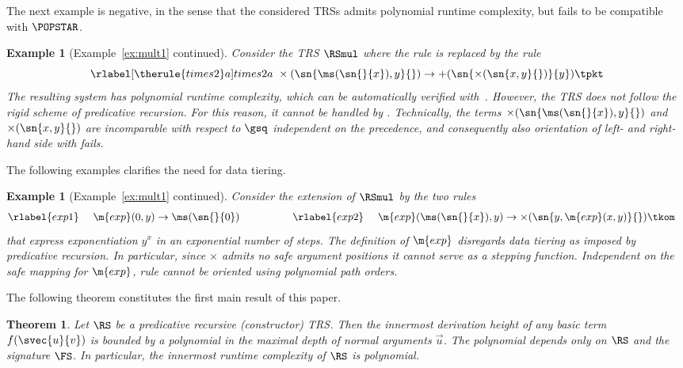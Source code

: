 \documentclass{LMCS}
\newtheorem{example}[thm]{Example}
\newtheorem{theorem}[thm]{Theorem}
\begin{document}
The next example is negative, in the sense that the considered TRSs admits
polynomial runtime complexity, but fails to be compatible with $\POPSTAR$.
\begin{example}[Example~\ref{ex:mult1} continued]
Consider the TRS $\RSmul$ where the rule  is replaced by the rule
  $$
  \rlabel[\therule{times2}a]{times2a}~\times(\sn{\ms(\sn{}{x}),y}{}) \to +(\sn{\times(\sn{x,y}{})}{y})
  \tpkt
  $$
  The resulting system has polynomial runtime complexity, which can
  be automatically verified with~\TCT. However, the TRS does not follow the rigid 
  scheme of predicative recursion. For this reason, it cannot be handled by \POPSTAR.\@
  Technically, the terms $\times(\sn{\ms(\sn{}{x}),y}{})$ and $\times(\sn{x,y}{})$ 
  are incomparable with respect to $\gsq$ independent on the precedence, and 
  consequently also orientation of left- and right-hand side with 
   fails. 
\end{example}

The following examples clarifies the need for data tiering.
\begin{example}[Example~\ref{ex:mult1} continued]
  Consider the extension of $\RSmul$ by the two rules
  \begin{alignat*}{4}
    \rlabel{exp1} &~& \m{exp}(0,y) & \to \ms(\sn{}{0})  \qquad\qquad &
    \rlabel{exp2} &~& \m{exp}(\ms(\sn{}{x}),y) & \to \times(\sn{y,\m{exp}(x,y)}{}) \tkom
  \end{alignat*}
  that express exponentiation $y^x$ in an exponential number of steps. 
The definition of $\m{exp}$ disregards data tiering as imposed by predicative recursion.
  In particular, since $\times$ admits no safe argument positions it
  cannot serve as a stepping function. Independent on the safe mapping for $\m{exp}$, 
  rule  cannot be oriented using polynomial path orders.
\end{example}

The following theorem constitutes the first main result of this paper.
\begin{theorem}\label{t:popstar}
  Let $\RS$ be a predicative recursive (constructor) TRS.\@
  Then the innermost derivation height of any basic term 
  $f(\svec{u}{v})$ is bounded by a polynomial in the 
  maximal depth of normal arguments $\vec{u}$.
  The polynomial depends only on $\RS$ and the signature $\FS$.
  In particular, the innermost runtime complexity of $\RS$ is polynomial.
\end{theorem}
\end{document}
